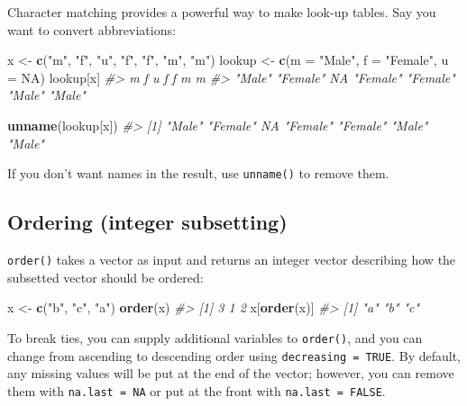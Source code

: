 \documentclass[]{book}
\newenvironment{Shaded}{\begin{snugshade}}{\end{snugshade}}
\newcommand{\KeywordTok}[1]{\textcolor[rgb]{0.13,0.29,0.53}{\textbf{#1}}}
\newcommand{\DataTypeTok}[1]{\textcolor[rgb]{0.13,0.29,0.53}{#1}}
\newcommand{\StringTok}[1]{\textcolor[rgb]{0.31,0.60,0.02}{#1}}
\newcommand{\CommentTok}[1]{\textcolor[rgb]{0.56,0.35,0.01}{\textit{#1}}}
\newcommand{\OtherTok}[1]{\textcolor[rgb]{0.56,0.35,0.01}{#1}}
\newcommand{\NormalTok}[1]{#1}
\theoremstyle{definition}
\theoremstyle{definition}
\theoremstyle{definition}
\theoremstyle{remark}
\begin{document}
Character matching provides a powerful way to make look-up tables. Say
you want to convert abbreviations:

\begin{Shaded}
\begin{Highlighting}[]
\NormalTok{x <-}\StringTok{ }\KeywordTok{c}\NormalTok{(}\StringTok{"m"}\NormalTok{, }\StringTok{"f"}\NormalTok{, }\StringTok{"u"}\NormalTok{, }\StringTok{"f"}\NormalTok{, }\StringTok{"f"}\NormalTok{, }\StringTok{"m"}\NormalTok{, }\StringTok{"m"}\NormalTok{)}
\NormalTok{lookup <-}\StringTok{ }\KeywordTok{c}\NormalTok{(}\DataTypeTok{m =} \StringTok{"Male"}\NormalTok{, }\DataTypeTok{f =} \StringTok{"Female"}\NormalTok{, }\DataTypeTok{u =} \OtherTok{NA}\NormalTok{)}
\NormalTok{lookup[x]}
\CommentTok{#>        m        f        u        f        f        m        m }
\CommentTok{#>   "Male" "Female"       NA "Female" "Female"   "Male"   "Male"}

\KeywordTok{unname}\NormalTok{(lookup[x])}
\CommentTok{#> [1] "Male"   "Female" NA       "Female" "Female" "Male"   "Male"}
\end{Highlighting}
\end{Shaded}

If you don't want names in the result, use \texttt{unname()} to remove
them.

\subsection{Ordering (integer
subsetting)}\label{ordering-integer-subsetting}

\texttt{order()} takes a vector as input and returns an integer vector
describing how the subsetted vector should be ordered:

\begin{Shaded}
\begin{Highlighting}[]
\NormalTok{x <-}\StringTok{ }\KeywordTok{c}\NormalTok{(}\StringTok{"b"}\NormalTok{, }\StringTok{"c"}\NormalTok{, }\StringTok{"a"}\NormalTok{)}
\KeywordTok{order}\NormalTok{(x)}
\CommentTok{#> [1] 3 1 2}
\NormalTok{x[}\KeywordTok{order}\NormalTok{(x)]}
\CommentTok{#> [1] "a" "b" "c"}
\end{Highlighting}
\end{Shaded}

To break ties, you can supply additional variables to \texttt{order()},
and you can change from ascending to descending order using
\texttt{decreasing\ =\ TRUE}. By default, any missing values will be put
at the end of the vector; however, you can remove them with
\texttt{na.last\ =\ NA} or put at the front with
\texttt{na.last\ =\ FALSE}.
\end{document}
